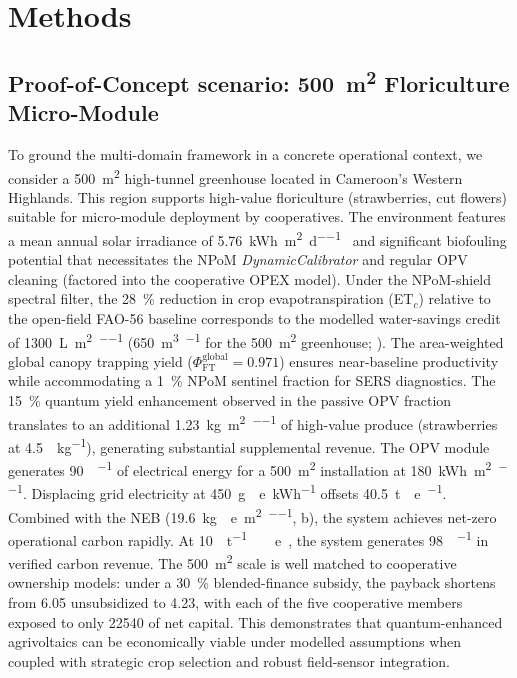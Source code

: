 \documentclass[preprint,12pt]{elsarticle}
\begin{document}

\section*{Methods}

\subsection*{Proof-of-Concept scenario: \qty{500}{\m\squared} Floriculture Micro-Module}

To ground the multi-domain framework in a concrete operational context, we consider a \qty{500}{\m\squared} high-tunnel greenhouse located in Cameroon's Western Highlands. This region supports high-value floriculture (strawberries, cut flowers) suitable for micro-module deployment by cooperatives. The environment features a mean annual solar irradiance of \qty{5.76}{\kWh\per\m\squared\per\day}~\cite{FAO2022} and significant biofouling potential that necessitates the NPoM \textit{DynamicCalibrator} and regular OPV cleaning (factored into the cooperative OPEX model). Under the NPoM-shield spectral filter, the \qty{28}{\percent} reduction in crop evapotranspiration (ET$_c$) relative to the open-field FAO-56 baseline corresponds to the modelled water-savings credit of \qty{1300}{\L\per\m\squared\per\yr} (\qty{650}{\m\cubed\per\yr} for the \qty{500}{\m\squared} greenhouse; ). The area-weighted global canopy trapping yield ($\Phi_{\mathrm{FT}}^{\mathrm{global}} = 0.971$) ensures near-baseline productivity while accommodating a \qty{1}{\percent} NPoM sentinel fraction for SERS diagnostics. The \qty{15}{\percent} quantum yield enhancement observed in the passive OPV fraction translates to an additional \qty{1.23}{\kg\per\m\squared\per\yr} of high-value produce (strawberries at \qty{4.5}{\USD\per\kg}), generating substantial supplemental revenue. The OPV module generates \qty{90}{\MWh\per\yr} of electrical energy for a \qty{500}{\m\squared} installation at \qty{180}{\kWh\per\m\squared\per\yr}. Displacing grid electricity at \qty{450}{\g{}e\per\kWh} offsets \qty{40.5}{\tonne{}e\per\yr}. Combined with the NEB (\qty{19.6}{\kg{}e\per\m\squared\per\yr}, b), the system achieves net-zero operational carbon rapidly. At \qty{10}{\USD\per\tonne\ e}~\cite{ICVCM2024}, the system generates \qty{98}{\USD\per\yr} in verified carbon revenue. The \qty{500}{\m\squared} scale is well matched to cooperative ownership models: under a \qty{30}{\percent} blended-finance subsidy, the payback shortens from \qty{6.05}{\yr} unsubsidized to \qty{4.23}{\yr}, with each of the five cooperative members exposed to only \qty{22540}{\USD} of net capital. This demonstrates that quantum-enhanced agrivoltaics can be economically viable under modelled assumptions when coupled with strategic crop selection and robust field-sensor integration.
\end{document}
